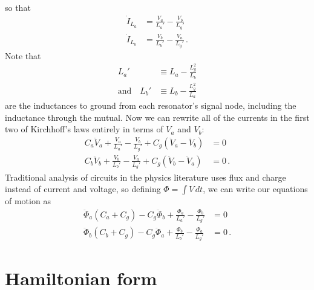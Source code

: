 \documentclass{article}
\begin{document}
so that
\begin{align*}
  \dot I_{L_a} &= \frac{V_a}{L_a'} - \frac{V_b}{L_g'} \\
  \dot I_{L_b} &= \frac{V_b}{L_b'} - \frac{V_a}{L_g'} \, .
\end{align*}
Note that
\begin{align*}
  L_a' & \equiv L_a - \frac{L_g^2}{L_b} \\
  \text{and} \quad
  L_b' & \equiv L_b - \frac{L_g^2}{L_a}
\end{align*}
are the inductances to ground from each resonator's signal node, including the inductance through the mutual.
Now we can rewrite all of the currents in the first two of Kirchhoff's laws entirely in terms of $V_a$ and $V_b$:
\begin{align*}
  C_a \ddot V_a + \frac{V_a}{L_a'} - \frac{V_b}{L_g'} + C_g (\ddot V_a - \ddot V_b) &= 0 \\
  C_b \ddot V_b + \frac{V_b}{L_b'} - \frac{V_a}{L_g'} + C_g (\ddot V_b - \ddot V_a) &= 0 \, .
\end{align*}
Traditional analysis of circuits in the physics literature uses flux and charge instead of current and voltage, so defining $\Phi = \int V \, dt$, we can write our equations of motion as
\begin{align*}
  \ddot \Phi_a (C_a + C_g) - C_g \ddot \Phi_b + \frac{\Phi_a}{L_a'} - \frac{\Phi_b}{L_g'} &= 0 \\
  \ddot \Phi_b (C_b + C_g) - C_g \ddot \Phi_a + \frac{\Phi_b}{L_b'} - \frac{\Phi_a}{L_g'} &= 0 \, .
\end{align*}

\section{Hamiltonian form}
\end{document}
